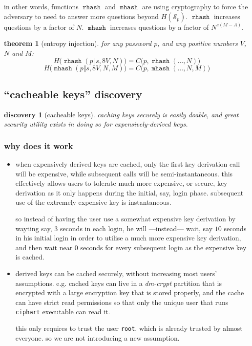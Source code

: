 \documentclass[twocolumn]{article}
\newtheorem{theorem}{theorem}
\newtheorem{discovery}{discovery}
\DeclareMathOperator{\rhash}{\mathtt{rhash}}
\DeclareMathOperator{\mhash}{\mathtt{mhash}}
\begin{document}
in other words, functions $\rhash$ and $\mhash$ are using cryptography to
force the adversary to need to answer more questions beyond
$H(\mathcal{S}_p)$.  $\rhash$ increases questions by a factor of $N$.
$\mhash$ increases questions by a factor of $N^{e(M-A)}$.

\begin{theorem}[entropy injection] \label{theorem_entropy_injection}
    for any password $p$, and any positive numbers $V$, $N$ and $M$:
    \[
        H\Big(\rhash(p\Vert s, 8V, N)\Big) = C\Big(p, \rhash(\ldots, N)\Big)
    \]
    \[
        H\Big(\mhash(p\Vert s, 8V, N, M)\Big) = C\Big(p, \mhash(\ldots, N,
        M)\Big)
    \]
\end{theorem}

\subsection{``cacheable keys'' discovery}
\begin{discovery}[cacheable keys]\label{discov_key_caching}
    caching keys securely is easily doable, and great security utility
    exists in doing so for expensively-derived keys.
\end{discovery}

\subsubsection{why does it work}
\begin{itemize}
    \item when expensively derived keys are cached, only the first key
    derivation call will be expensive, while subsequent calls will be
    semi-instantaneous.  this effectively allows users to tolerate much
    more expensive, or secure, key derivation as it only happens during the
    initial, say, login phase.  subsequent use of the extremely expensive
    key is instantaneous.

    so instead of having the user use a somewhat expensive key derivation
    by wayting say, $3$ seconds in each login, he will ---instead--- wait,
    say $10$ seconds in his initial login in order to utilise a much more
    expensive key derivation, and then wait near $0$ seconds for every
    subsequent login as the expensive key is cached.

    \item derived keys can be cached securely, without increasing most
    users' assumptions.  e.g. cached keys can live in a \emph{dm-crypt}
    partition that is encrypted with a large encryption key that is stored
    properly, and the cache can have strict read permissions so that only
    the unique user that runs \texttt{ciphart} executable can read it.

    this only requires to trust the user \texttt{root}, which is already
    trusted by almost everyone.  so we are not introducing a new
    assumption.
\end{itemize}
\end{document}
